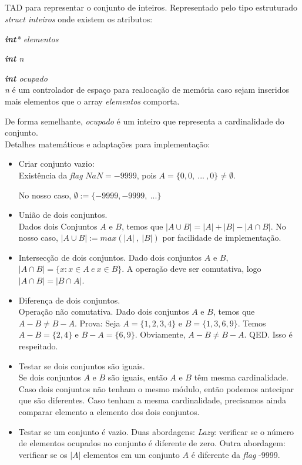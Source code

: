 \newpage
\subsection{}
TAD para representar o conjunto de inteiros. Representado pelo tipo estruturado \textit{struct inteiros} onde existem os atributos:

	\textit{\textbf{int}* elementos}
	
	\textit{\textbf{int} n}

	\textit{\textbf{int} ocupado}\\


\textit{n} é um controlador de espaço para realocação de memória caso sejam inseridos mais elementos que o array \textit{elementos} comporta. 

De forma semelhante, \textit{ocupado} é um inteiro que representa a cardinalidade do conjunto.\\

Detalhes matemáticos e adaptações para implementação: 
 
\begin{itemize}
	\item Criar conjunto vazio:\\ 
		Existência da \textit{flag} $NaN= -9999$, pois $A = \{0, 0 , \ ...  \ , 0\} \neq \emptyset$. 
		
		No nosso caso, $\emptyset := \{-9999, -9999, \ ... \}$
		
	\item União de dois conjuntos. \\
	Dados dois Conjuntos $A$ e $B$, temos que $| A \cup B| = |A| + |B| - |A \cap B|$. 
	No nosso caso, $| A \cup B| := max(|A| \ , \ |B|)$ por facilidade de implementação. 
	
	\item Intersecção de dois conjuntos. 
	Dado dois conjuntos $A$ e $B$, $|A \cap B| = \{x : x \in A \ e \  x \in B\}$. A operação deve ser comutativa, logo $|A \cap B| = |B \cap A|$. 
	
	\item Diferença de dois conjuntos. \\
	Operação não comutativa. Dado dois conjuntos $A$ e $B$, temos que $A-B \neq B-A$. Prova: Seja $A = \{ 1, 2, 3, 4\}$ e $B = \{1, 3, 6, 9\}$. Temos $A-B = \{2, 4\}$ e $B-A = \{ 6, 9\}$. Obviamente, $A-B \neq B-A$. QED. Isso é respeitado. 
	
	\item Testar se dois conjuntos são iguais. \\
	Se dois conjuntos $A$ e  $B$ são iguais, então $A$ e $B$   têm mesma cardinalidade. Caso dois conjuntos não tenham o mesmo módulo, então podemos antecipar que são diferentes. 
	Caso tenham a mesma cardinalidade, precisamos ainda comparar elemento a elemento dos dois conjuntos. 
	
	\item  Testar se um conjunto é vazio. Duas abordagens: \textit{Lazy}: verificar se o número de elementos ocupados no conjunto é diferente de zero. Outra abordagem: verificar se os $|A|$ elementos em um conjunto $A$ é diferente da \textit{flag} -9999. 
\end{itemize}

